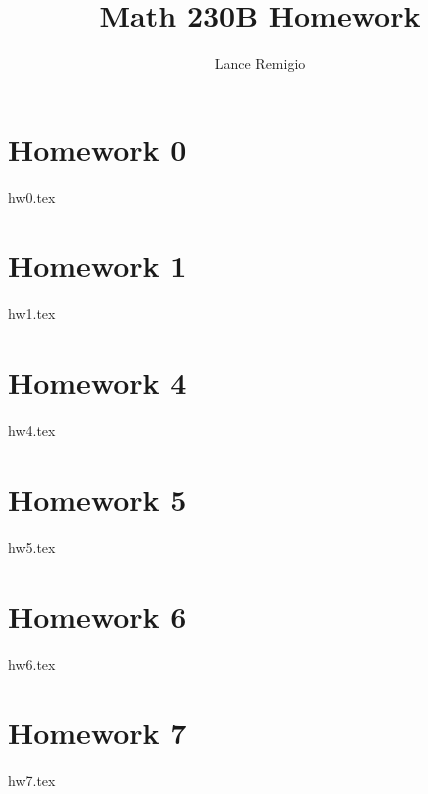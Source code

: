 \documentclass[a4paper]{article}
\title{Math 230B Homework}
\author{Lance Remigio}
\begin{document}
\maketitle

\section*{Homework 0}

{hw0.tex}

\section*{Homework 1}

{hw1.tex}



\section*{Homework 4}

{hw4.tex}

\section*{Homework 5}

{hw5.tex}

\section*{Homework 6}

{hw6.tex}

\section*{Homework 7}

{hw7.tex}
\end{document}
